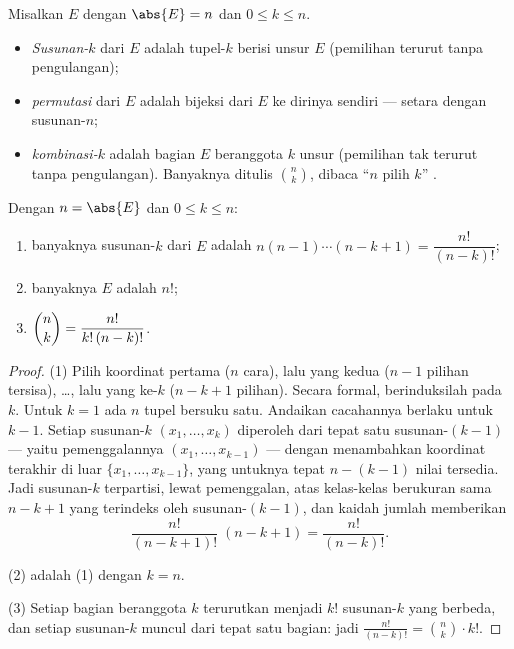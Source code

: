 \begin{definition}\label{def:b1:counting:objects}
Misalkan $E$  dengan $\abs{E} = n$ dan $0 \leq k \leq n$.
\begin{itemize}
  \item \emph{Susunan-$k$} dari $E$ adalah tupel-$k$  berisi
        unsur $E$ (pemilihan terurut tanpa pengulangan);
  \item \emph{permutasi} dari $E$ adalah bijeksi
        dari $E$ ke dirinya sendiri --- setara dengan susunan-$n$;
  \item \emph{kombinasi-$k$} adalah  bagian $E$ beranggota $k$ unsur
        (pemilihan tak terurut tanpa pengulangan). Banyaknya
        ditulis $\binom{n}{k}$, dibaca ``$n$ pilih $k$''
        .
\end{itemize}
\end{definition}

\begin{theorem}\label{thm:b1:counting:counts}
Dengan $n = \abs{E}$ dan $0 \leq k \leq n$:
\begin{enumerate}
  \item banyaknya susunan-$k$ dari $E$ adalah $n (n-1) \cdots
        (n-k+1) = \dfrac{n!}{(n-k)!}$;
  \item banyaknya  $E$ adalah $n!$;
  \item $\dbinom{n}{k} = \dfrac{n!}{k!\,(n-k)!}$.
\end{enumerate}
\end{theorem}

\begin{proof}
(1) Pilih koordinat pertama ($n$ cara), lalu yang kedua ($n - 1$
pilihan tersisa), \dots, lalu yang ke-$k$ ($n - k + 1$ pilihan).
Secara formal, berinduksilah pada $k$. Untuk $k = 1$ ada $n$ tupel
 bersuku satu. Andaikan cacahannya berlaku untuk $k - 1$. Setiap
susunan-$k$ $(x_1, \dots, x_k)$ diperoleh dari tepat satu
susunan-$(k-1)$ --- yaitu pemenggalannya $(x_1, \dots, x_{k-1})$
--- dengan menambahkan koordinat terakhir di luar $\{x_1, \dots,
x_{k-1}\}$, yang untuknya tepat $n - (k - 1)$ nilai tersedia.
Jadi susunan-$k$ terpartisi, lewat pemenggalan, atas
kelas-kelas berukuran sama $n - k + 1$ yang terindeks oleh
susunan-$(k-1)$, dan kaidah jumlah memberikan
\[
\frac{n!}{(n-k+1)!}\;(n - k + 1) = \frac{n!}{(n-k)!} .
\]

(2) adalah (1) dengan $k = n$.

(3) Setiap  bagian beranggota $k$ terurutkan menjadi $k!$ susunan-$k$ yang berbeda, dan
setiap susunan-$k$ muncul dari tepat satu  bagian: jadi
$\frac{n!}{(n-k)!} = \binom nk \cdot k!$.
\end{proof}

